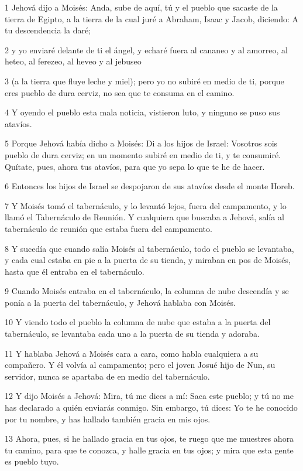 \par 1 Jehová dijo a Moisés: Anda, sube de aquí, tú y el pueblo que sacaste de la tierra de Egipto, a la tierra de la cual juré a Abraham, Isaac y Jacob, diciendo: A tu descendencia la daré;
\par 2 y yo enviaré delante de ti el ángel, y echaré fuera al cananeo y al amorreo, al heteo, al ferezeo, al heveo y al jebuseo
\par 3 (a la tierra que fluye leche y miel); pero yo no subiré en medio de ti, porque eres pueblo de dura cerviz, no sea que te consuma en el camino.
\par 4 Y oyendo el pueblo esta mala noticia, vistieron luto, y ninguno se puso sus atavíos.
\par 5 Porque Jehová había dicho a Moisés: Di a los hijos de Israel: Vosotros sois pueblo de dura cerviz; en un momento subiré en medio de ti, y te consumiré. Quítate, pues, ahora tus atavíos, para que yo sepa lo que te he de hacer.
\par 6 Entonces los hijos de Israel se despojaron de sus atavíos desde el monte Horeb.
\par 7 Y Moisés tomó el tabernáculo, y lo levantó lejos, fuera del campamento, y lo llamó el Tabernáculo de Reunión. Y cualquiera que buscaba a Jehová, salía al tabernáculo de reunión que estaba fuera del campamento.
\par 8 Y sucedía que cuando salía Moisés al tabernáculo, todo el pueblo se levantaba, y cada cual estaba en pie a la puerta de su tienda, y miraban en pos de Moisés, hasta que él entraba en el tabernáculo.
\par 9 Cuando Moisés entraba en el tabernáculo, la columna de nube descendía y se ponía a la puerta del tabernáculo, y Jehová hablaba con Moisés.
\par 10 Y viendo todo el pueblo la columna de nube que estaba a la puerta del tabernáculo, se levantaba cada uno a la puerta de su tienda y adoraba.
\par 11 Y hablaba Jehová a Moisés cara a cara, como habla cualquiera a su compañero. Y él volvía al campamento; pero el joven Josué hijo de Nun, su servidor, nunca se apartaba de en medio del tabernáculo.
\par 12 Y dijo Moisés a Jehová: Mira, tú me dices a mí: Saca este pueblo; y tú no me has declarado a quién enviarás conmigo. Sin embargo, tú dices: Yo te he conocido por tu nombre, y has hallado también gracia en mis ojos.
\par 13 Ahora, pues, si he hallado gracia en tus ojos, te ruego que me muestres ahora tu camino, para que te conozca, y halle gracia en tus ojos; y mira que esta gente es pueblo tuyo.
